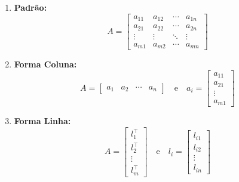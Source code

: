 \documentclass[12pt,openany]{book}
\begin{document}
\begin{enumerate}[label=(\roman*)]
    \item \textbf{Padrão:}
        \[
            A = \begin{bmatrix}
                    a_{11} & a_{12} & \cdots & a_{1n} \\
                    a_{21} & a_{22} & \cdots & a_{2n} \\
                    \vdots & \vdots & \ddots & \vdots \\
                    a_{m1} & a_{m2} & \cdots & a_{mn}
                \end{bmatrix}
        \]

    \item \textbf{Forma Coluna:}
        \[
            A = \begin{bmatrix}
                    a_1 & a_2 & \cdots & a_n
                \end{bmatrix}
            \quad \text{e} \quad
            a_i =   \begin{bmatrix}
                        a_{11} \\
                        a_{21} \\
                        \vdots \\
                        a_{m1}
                    \end{bmatrix}
        \]
    \item \textbf{Forma Linha:}
        \[
            A = \begin{bmatrix}
                    l_1^\top \\
                    l_2^\top \\
                    \vdots \\
                    l_m^\top
                \end{bmatrix}
            \quad\text{e}\quad
            l_i =   \begin{bmatrix}
                        l_{i1} \\
                        l_{i2} \\
                        \vdots \\
                        l_{in}
                    \end{bmatrix}
        \]
\end{enumerate}
\end{document}
